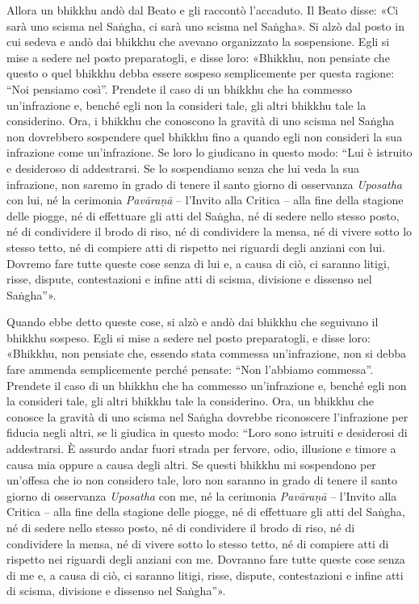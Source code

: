 Allora un bhikkhu andò dal Beato e gli raccontò l’accaduto. Il Beato
disse: «Ci sarà uno scisma nel Saṅgha, ci sarà uno scisma nel Saṅgha».
Si alzò dal posto in cui sedeva e andò dai bhikkhu che avevano
organizzato la sospensione. Egli si mise a sedere nel posto
preparatogli, e disse loro: «Bhikkhu, non pensiate che questo o quel
bhikkhu debba essere sospeso semplicemente per questa ragione: “Noi
pensiamo così”. Prendete il caso di un bhikkhu che ha commesso
un’infrazione e, benché egli non la consideri tale, gli altri bhikkhu
tale la considerino. Ora, i bhikkhu che conoscono la gravità di uno
scisma nel Saṅgha non dovrebbero sospendere quel bhikkhu fino a quando
egli non consideri la sua infrazione come un’infrazione. Se loro lo
giudicano in questo modo: “Lui è istruito e desideroso di addestrarsi.
Se lo sospendiamo senza che lui veda la sua infrazione, non saremo in
grado di tenere il santo giorno di osservanza \emph{Uposatha} con lui, né la
cerimonia \emph{Pavāraṇā} – l’Invito alla Critica – alla fine della stagione
delle piogge, né di effettuare gli atti del Saṅgha, né di sedere nello
stesso posto, né di condividere il brodo di riso, né di condividere la
mensa, né di vivere sotto lo stesso tetto, né di compiere atti di
rispetto nei riguardi degli anziani con lui. Dovremo fare tutte queste
cose senza di lui e, a causa di ciò, ci saranno litigi, risse, dispute,
contestazioni e infine atti di scisma, divisione e dissenso nel
Saṅgha”».


Quando ebbe detto queste cose, si alzò e andò dai bhikkhu che seguivano
il bhikkhu sospeso. Egli si mise a sedere nel posto preparatogli, e
disse loro: «Bhikkhu, non pensiate che, essendo stata commessa
un’infrazione, non si debba fare ammenda semplicemente perché pensate:
“Non l’abbiamo commessa”. Prendete il caso di un bhikkhu che ha commesso
un’infrazione e, benché egli non la consideri tale, gli altri bhikkhu
tale la considerino. Ora, un bhikkhu che conosce la gravità di uno
scisma nel Saṅgha dovrebbe riconoscere l’infrazione per fiducia negli
altri, se li giudica in questo modo: “Loro sono istruiti e desiderosi di
addestrarsi. È assurdo andar fuori strada per fervore, odio, illusione e
timore a causa mia oppure a causa degli altri. Se questi bhikkhu mi
sospendono per un’offesa che io non considero tale, loro non saranno in
grado di tenere il santo giorno di osservanza \emph{Uposatha} con me, né la
cerimonia \emph{Pavāraṇā} – l’Invito alla Critica – alla fine della stagione
delle piogge, né di effettuare gli atti del Saṅgha, né di sedere nello
stesso posto, né di condividere il brodo di riso, né di condividere la
mensa, né di vivere sotto lo stesso tetto, né di compiere atti di
rispetto nei riguardi degli anziani con me. Dovranno fare tutte queste
cose senza di me e, a causa di ciò, ci saranno litigi, risse, dispute,
contestazioni e infine atti di scisma, divisione e dissenso nel
Saṅgha”».


